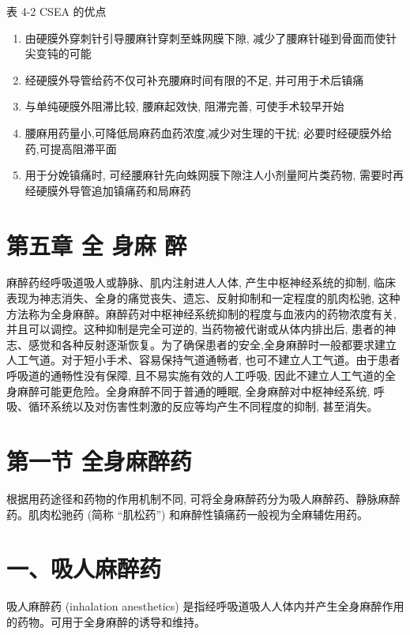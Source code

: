 \documentclass[10pt]{article}
\begin{document}
表 4-2 CSEA 的优点

\begin{enumerate}
  \item 由硬膜外穿刺针引导腰麻针穿刺至蛛网膜下隙, 减少了腰麻针碰到骨面而使针尖变钝的可能

  \item 经硬膜外导管给药不仅可补充腰麻时间有限的不足, 并可用于术后镇痛

  \item 与单纯硬膜外阻滞比较, 腰麻起效快, 阻滞完善, 可使手术较早开始

  \item 腰麻用药量小,可降低局麻药血药浓度,减少对生理的干扰; 必要时经硬膜外给药,可提高阻滞平面

  \item 用于分娩镇痛时, 可经腰麻针先向蛛网膜下隙注人小剂量阿片类药物, 需要时再经硬膜外导管追加镇痛药和局麻药

\end{enumerate}

\section*{第五章 全 身麻 醉}
麻醉药经呼吸道吸人或静脉、肌内注射进人人体, 产生中枢神经系统的抑制, 临床表现为神志消失、全身的痛觉丧失、遗忘、反射抑制和一定程度的肌肉松驰, 这种方法称为全身麻醉。麻醉药对中枢神经系统抑制的程度与血液内的药物浓度有关, 并且可以调控。这种抑制是完全可逆的, 当药物被代谢或从体内排出后, 患者的神志、感觉和各种反射逐渐恢复。为了确保患者的安全,全身麻醉时一般都要求建立人工气道。对于短小手术、容易保持气道通畅者, 也可不建立人工气道。由于患者呼吸道的通畅性没有保障, 且不易实施有效的人工呼吸, 因此不建立人工气道的全身麻醉可能更危险。全身麻醉不同于普通的睡眠, 全身麻醉对中枢神经系统, 呼吸、循环系统以及对伤害性刺激的反应等均产生不同程度的抑制, 甚至消失。

\section*{第一节 全身麻醉药}
根据用药途径和药物的作用机制不同, 可将全身麻醉药分为吸人麻醉药、静脉麻醉药。肌肉松驰药 (简称 “肌松药”) 和麻醉性镇痛药一般视为全麻辅佐用药。

\section*{一、吸人麻醉药}
吸人麻醉药 (inhalation anesthetics) 是指经呼吸道吸人人体内并产生全身麻醉作用的药物。可用于全身麻醉的诱导和维持。
\end{document}
